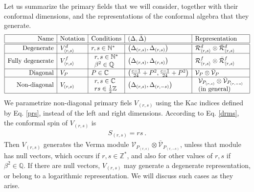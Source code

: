 \documentclass[12pt, a4paper]{article}
\theoremstyle{break}
\begin{document}
Let us summarize the primary fields that we will consider, together with their conformal dimensions, and the representations of the conformal algebra that they generate. 
\begin{align}
 \begin{array}{|r|l|l|l|l|}
  \hline 
  \text{Name} & \text{Notation} & \text{Conditions} & (\Delta,\bar \Delta) & \text{Representation}
  \\
  \hline \hline 
  \text{Degenerate} &  V^d_{\langle r,s\rangle} &  r,s\in\mathbb{N}^* & \left(\Delta_{(r,s)},\Delta_{(r,s)}\right)  & \mathcal{R}^d_{\langle r,s\rangle}\otimes \bar{\mathcal{R}}^d_{\langle r,s\rangle} 
  \\
  \hline 
  \text{Fully degenerate} & V^f_{\langle r,s\rangle} & \begin{array}{l} r,s\in\mathbb{N}^* \\ \beta^2\in\mathbb{Q} \end{array} & \left(\Delta_{(r,s)},\Delta_{(r,s)}\right)  & \mathcal{R}^f_{\langle r,s\rangle}\otimes \bar{\mathcal{R}}^f_{\langle r,s\rangle} 
  \\
  \hline 
  \text{Diagonal} & V_P & P\in\mathbb{C} & \left(\tfrac{c-1}{24}+P^2,\tfrac{c-1}{24}+P^2\right) & \mathcal{V}_P\otimes \bar{\mathcal{V}}_P 
  \\
  \hline 
  \text{Non-diagonal} & V_{(r,s)} & 
  \begin{array}{l} r,s\in\mathbb{C} \\ 
  rs\in \tfrac12\mathbb{Z} \end{array} & \left(\Delta_{(r,s)},\Delta_{(r,-s)}\right) & 
  \begin{array}{l} \mathcal{V}_{P_{(r,s)}} \otimes \bar{\mathcal{V}}_{P_{(r,-s)}} \\ \text{(in general)} \end{array}
  \\
  \hline 
 \end{array}
 \label{fields}
\end{align}
We parametrize non-diagonal primary fiels $V_{(r,s)}$ using the Kac indices defined by Eq. \eqref{prs}, instead of the left and right dimensions. 
According to Eq. \eqref{drms}, the conformal spin of $V_{(r,s)}$ is 
\begin{align}
 \boxed{S_{(r,s)}= rs} \ . 
 \label{srs}
\end{align}
Then $V_{(r,s)}$ generates the Verma module $\mathcal{V}_{P_{(r,s)}} \otimes \bar{\mathcal{V}}_{P_{(r,-s)}}$, unless that module has null vectors, which occurs if $r,s\in\mathbb{Z}^*$, and also for other values of $r,s$ if $\beta^2\in\mathbb{Q}$. If there are null vectors, $V_{(r,s)}$ may generate a degenerate representation, or belong to a logarithmic representation. We will discuss such cases as they arise.  
\end{document}
